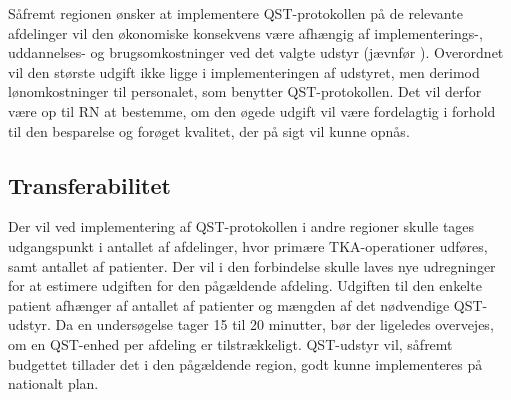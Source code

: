 Såfremt regionen ønsker at implementere QST-protokollen på de relevante afdelinger vil den økonomiske konsekvens være afhængig af implementerings-, uddannelses- og brugsomkostninger ved det valgte udstyr (jævnfør ). Overordnet vil den største udgift ikke ligge i implementeringen af udstyret, men derimod lønomkostninger til personalet, som benytter QST-protokollen. Det vil derfor være op til RN at bestemme, om den øgede udgift vil være fordelagtig i forhold til den besparelse og forøget kvalitet, der på sigt vil kunne opnås. 


\subsection{Transferabilitet}
Der vil ved implementering af QST-protokollen i andre regioner skulle tages udgangspunkt i antallet af afdelinger, hvor primære TKA-operationer udføres, samt antallet af patienter. Der vil i den forbindelse skulle laves nye udregninger for at estimere udgiften for den pågældende afdeling. Udgiften til den enkelte patient afhænger af antallet af patienter og mængden af det nødvendige QST-udstyr. Da en undersøgelse tager 15 til 20 minutter, bør der ligeledes overvejes, om en QST-enhed per afdeling er tilstrækkeligt. QST-udstyr vil, såfremt budgettet tillader det i den pågældende region, godt kunne implementeres på nationalt plan.

